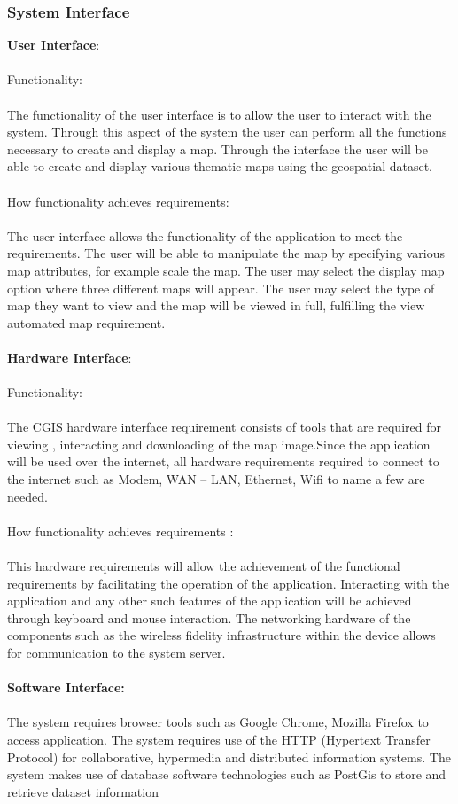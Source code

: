 \documentclass{article}
\begin{document}
        	\subsubsection{System Interface}{
\textbf{User Interface}:\\\\
Functionality:\\\\
The functionality of the user interface is to allow the user to interact with the system. Through this aspect of the system the user can perform all the functions necessary to create and display a map. Through the interface the user will be able to create and display various thematic maps using the geospatial dataset.\\\\
How functionality achieves requirements:\\\\
The user interface allows the functionality of the application to meet the requirements. The user will be able to manipulate the map by specifying various map attributes, for example scale the map. The user may select the display map option where three different maps will appear. The user may select the type of map they want to view and the map will be viewed in full, fulfilling the view automated map requirement.\\\\
\textbf{Hardware Interface}:\\\\
Functionality:\\\\
The CGIS hardware interface requirement consists of tools that are required for viewing , interacting and downloading of the map image.Since the application will be used over the internet, all hardware requirements required to connect to the internet such as Modem, WAN – LAN, Ethernet, Wifi to name a few are needed.\\\\
How functionality achieves requirements :\\\\
This hardware requirements will allow the achievement of the functional requirements by facilitating the operation of the application. Interacting with the application and any other such features of the application will be achieved through keyboard and mouse interaction. The networking hardware of the components such as the wireless fidelity infrastructure within the device allows for communication to the system server.\\\\
\textbf{Software Interface:}\\\\
The system requires browser tools such as Google Chrome, Mozilla Firefox to access application.
The system requires use of the HTTP (Hypertext Transfer Protocol) for collaborative, hypermedia and distributed information systems. The system makes use of database software technologies such as PostGis to store and retrieve dataset information

}
\end{document}
